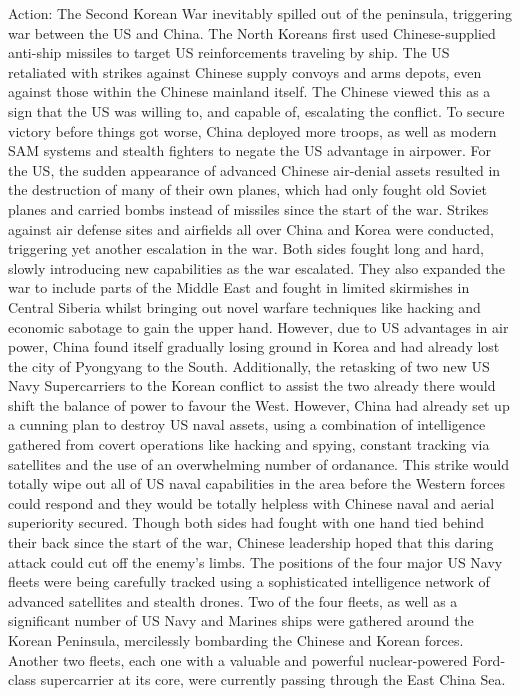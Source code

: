         Action:
            The Second Korean War inevitably spilled out of the peninsula, triggering war between the US and China. The North Koreans first used Chinese-supplied anti-ship missiles to target US reinforcements traveling by ship. The US retaliated with strikes against Chinese supply convoys and arms depots, even against those within the Chinese mainland itself. The Chinese viewed this as a sign that the US was willing to, and capable of, escalating the conflict. To secure victory before things got worse, China deployed more troops, as well as modern SAM systems and stealth fighters to negate the US advantage in airpower. For the US, the sudden appearance of advanced Chinese air-denial assets resulted in the destruction of many of their own planes, which had only fought old Soviet planes and carried bombs instead of missiles since the start of the war. Strikes against air defense sites and airfields all over China and Korea were conducted, triggering yet another escalation in the war.
            Both sides fought long and hard, slowly introducing new capabilities as the war escalated. They also expanded the war to include parts of the Middle East and fought in limited skirmishes in Central Siberia whilst bringing out novel warfare techniques like hacking and economic sabotage to gain the upper hand. 
            However, due to US advantages in air power, China found itself gradually losing ground in Korea and had already lost the city of Pyongyang to the South. Additionally, the retasking of two new US Navy Supercarriers to the Korean conflict to assist the two already there would shift the balance of power to favour the West. 
            However, China had already set up a cunning plan to destroy US naval assets, using a combination of intelligence gathered from covert operations like hacking and spying, constant tracking via satellites and the use of an overwhelming number of ordanance. This strike would totally wipe out all of US naval capabilities in the area before the Western forces could respond and they would be totally helpless with Chinese naval and aerial superiority secured. Though both sides had fought with one hand tied behind their back since the start of the war, Chinese leadership hoped that this daring attack could cut off the enemy's limbs.
            The positions of the four major US Navy fleets were being carefully tracked using a sophisticated intelligence network of advanced satellites and stealth drones. Two of the four fleets, as well as a significant number of US Navy and Marines ships were gathered around the Korean Peninsula, mercilessly bombarding the Chinese and Korean forces. Another two fleets, each one with a valuable and powerful nuclear-powered Ford-class supercarrier at its core, were currently passing through the East China Sea.

